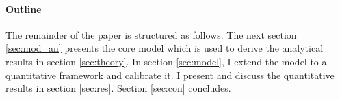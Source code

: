









\paragraph{Outline}
The remainder of the paper is structured as follows. The next section \ref{sec:mod_an} presents the core model which is used to derive the analytical results in section \ref{sec:theory}. In section \ref{sec:model}, I extend the model to a quantitative framework and calibrate it. I present and discuss the quantitative results in section \ref{sec:res}. Section \ref{sec:con} concludes.